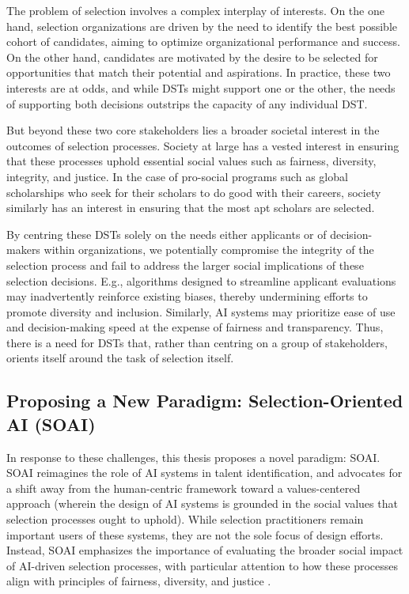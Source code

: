 The problem of selection involves a complex interplay of interests. On the one hand, selection organizations are driven by the need to identify the best possible cohort of candidates, aiming to optimize organizational performance and success. On the other hand, candidates are motivated by the desire to be selected for opportunities that match their potential and aspirations. In practice, these two interests are at odds, and while DSTs might support one or the other, the needs of supporting both decisions outstrips the capacity of any individual DST. %

But beyond these two core stakeholders lies a broader societal interest in the outcomes of selection processes. Society at large has a vested interest in ensuring that these processes uphold essential social values such as fairness, diversity, integrity, and justice. In the case of pro-social programs such as global scholarships who seek for their scholars to do good with their careers, society similarly has an interest in ensuring that the most apt scholars are selected.

By centring these DSTs solely on the needs either applicants or of decision-makers within organizations, we potentially compromise the integrity of the selection process and fail to address the larger social implications of these selection decisions. E.g., algorithms designed to streamline applicant evaluations may inadvertently reinforce existing biases, thereby undermining efforts to promote diversity and inclusion. Similarly, AI systems may prioritize ease of use and decision-making speed at the expense of fairness and transparency. Thus, there is a need for DSTs that, rather than centring on a group of stakeholders, orients itself around the task of selection itself.

\subsection{Proposing a New Paradigm: Selection-Oriented AI (SOAI)}
In response to these challenges, this thesis proposes a novel paradigm: SOAI. SOAI reimagines the role of AI systems in talent identification, and advocates for a shift away from the human-centric framework toward a values-centered approach (wherein the design of AI systems is grounded in the social values that selection processes ought to uphold). While selection practitioners remain important users of these systems, they are not the sole focus of design efforts. Instead, SOAI emphasizes the importance of evaluating the broader social impact of AI-driven selection processes, with particular attention to how these processes align with principles of fairness, diversity, and justice \cite{batyavalue}.

